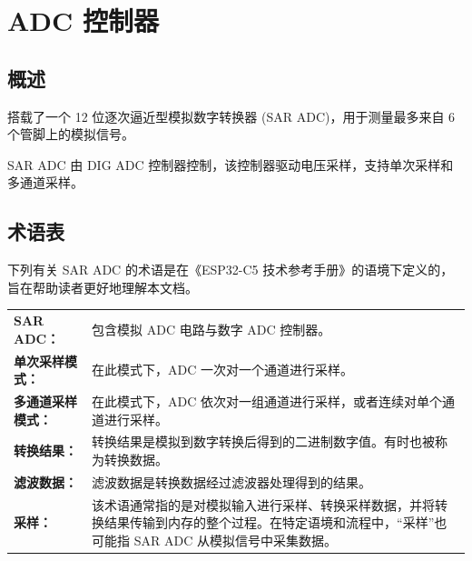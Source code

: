 \documentclass[main\_\_CN.tex]{subfiles}
\begin{document}

\ifglobal
\else
    \listoftodos
    {\let\clearpage\relax \listofdonetodos}
    \tableofcontents
\fi




\hypertarget{adc}{}
\chapter{ADC 控制器}
\label{mod:adc}



\section{概述}

\chipname{} 搭载了一个 12 位逐次逼近型模拟数字转换器 (SAR ADC)，用于测量最多来自 6 个管脚上的模拟信号。

SAR ADC 由 DIG ADC 控制器控制，该控制器驱动电压采样，支持单次采样和多通道采样。

\section{术语表}

下列有关 SAR ADC 的术语是在《ESP32-C5 技术参考手册》的语境下定义的，旨在帮助读者更好地理解本文档。

\begin{longtable}{ R{4cm} p{11cm} }
\textbf{SAR ADC：} & 包含模拟 ADC 电路与数字 ADC 控制器。\\
\textbf{单次采样模式：} & 在此模式下，ADC 一次对一个通道进行采样。 \\
\textbf{多通道采样模式：} & 在此模式下，ADC 依次对一组通道进行采样，或者连续对单个通道进行采样。\\
\textbf{转换结果：} & 转换结果是模拟到数字转换后得到的二进制数字值。有时也被称为转换数据。\\
\textbf{滤波数据：} & 滤波数据是转换数据经过滤波器处理得到的结果。 \\
\textbf{采样：} & 该术语通常指的是对模拟输入进行采样、转换采样数据，并将转换结果传输到内存的整个过程。在特定语境和流程中，“采样”也可能指 SAR ADC 从模拟信号中采集数据。\\
\end{longtable}
\end{document}
